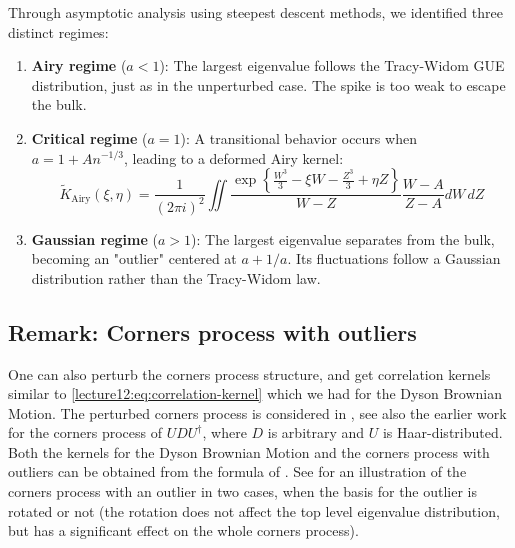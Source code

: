 \documentclass[letterpaper,11pt,oneside,reqno]{book}
\numberwithin{equation}{chapter}  %
\theoremstyle{definition}
\begin{document}
Through asymptotic analysis using steepest descent methods, we identified three distinct regimes:

\begin{enumerate}
\item \textbf{Airy regime} ($a < 1$): The largest eigenvalue follows the Tracy-Widom GUE distribution, just as in the unperturbed case. The spike is too weak to escape the bulk.

\item \textbf{Critical regime} ($a = 1$): A transitional behavior occurs when $a = 1 + An^{-1/3}$, leading to a deformed Airy kernel:
\begin{equation*}
\tilde{K}_{\text{Airy}}(\xi,\eta) = \frac{1}{(2\pi i)^2}\iint \frac{\exp\left\{\frac{W^3}{3}-\xi W-\frac{Z^3}{3}+\eta Z\right\}}{W-Z} \frac{W-A}{Z-A} dW\,dZ
\end{equation*}

\item \textbf{Gaussian regime} ($a > 1$): The largest eigenvalue separates from the bulk, becoming an "outlier" centered at $a + 1/a$. Its fluctuations follow a Gaussian distribution rather than the Tracy-Widom law.
\end{enumerate}


\subsection{Remark: Corners process with outliers}

One can also perturb the corners process structure, and get
correlation kernels similar to \eqref{lecture12:eq:correlation-kernel}
which we had for the Dyson Brownian Motion.
The perturbed corners process is
considered in \cite{Ferrari2014PerturbedGUE},
see also the earlier work \cite{Metcalfe2011GT}
for the corners process of $UDU^\dagger$, where $D$ is arbitrary and
$U$ is Haar-distributed. Both the kernels
for the Dyson Brownian Motion and the corners process
with outliers can be obtained from the formula of
\cite{Metcalfe2011GT}.
See  for an illustration of the corners process with an outlier
in two cases, when the basis for the outlier is rotated or not
(the rotation does not affect the top level eigenvalue distribution,
but has a significant effect on the whole corners process).
\end{document}
